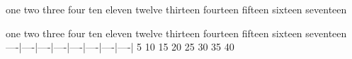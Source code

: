 one  two three four  ten eleven twelve
thirteen fourteen fifteen sixteen
seventeen

one  two three four  ten eleven twelve
thirteen fourteen fifteen sixteen
seventeen
----|----|----|----|----|----|----|----|
   5   10   15   20   25   30   35   40